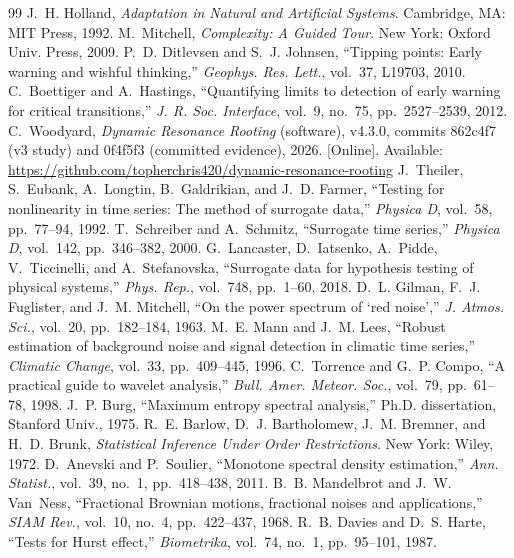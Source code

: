 \documentclass[10pt,twocolumn,letterpaper]{article}
\theoremstyle{definition}
\theoremstyle{remark}
\begin{document}
\footnotesize
\begin{thebibliography}{99}\setlength{\itemsep}{-0.8pt}\setlength{\parsep}{0pt}
 J.~H. Holland, \emph{Adaptation in Natural and Artificial Systems}. Cambridge, MA: MIT Press, 1992.
 M.~Mitchell, \emph{Complexity: A Guided Tour}. New York: Oxford Univ. Press, 2009.
 P.~D. Ditlevsen and S.~J. Johnsen, ``Tipping points: Early warning and wishful thinking,'' \emph{Geophys. Res. Lett.}, vol.~37, L19703, 2010.
 C.~Boettiger and A.~Hastings, ``Quantifying limits to detection of early warning for critical transitions,'' \emph{J. R. Soc. Interface}, vol.~9, no.~75, pp.~2527--2539, 2012.
 C.~Woodyard, \emph{Dynamic Resonance Rooting} (software), v4.3.0, commits 862c4f7 (v3 study) and 0f4f5f3 (committed evidence), 2026. [Online]. Available: \url{https://github.com/topherchris420/dynamic-resonance-rooting}
 J.~Theiler, S.~Eubank, A.~Longtin, B.~Galdrikian, and J.~D. Farmer, ``Testing for nonlinearity in time series: The method of surrogate data,'' \emph{Physica D}, vol.~58, pp.~77--94, 1992.
 T.~Schreiber and A.~Schmitz, ``Surrogate time series,'' \emph{Physica D}, vol.~142, pp.~346--382, 2000.
 G.~Lancaster, D.~Iatsenko, A.~Pidde, V.~Ticcinelli, and A.~Stefanovska, ``Surrogate data for hypothesis testing of physical systems,'' \emph{Phys. Rep.}, vol.~748, pp.~1--60, 2018.
 D.~L. Gilman, F.~J. Fuglister, and J.~M. Mitchell, ``On the power spectrum of `red noise','' \emph{J. Atmos. Sci.}, vol.~20, pp.~182--184, 1963.
 M.~E. Mann and J.~M. Lees, ``Robust estimation of background noise and signal detection in climatic time series,'' \emph{Climatic Change}, vol.~33, pp.~409--445, 1996.
 C.~Torrence and G.~P. Compo, ``A practical guide to wavelet analysis,'' \emph{Bull. Amer. Meteor. Soc.}, vol.~79, pp.~61--78, 1998.
 J.~P. Burg, ``Maximum entropy spectral analysis,'' Ph.D. dissertation, Stanford Univ., 1975.
 R.~E. Barlow, D.~J. Bartholomew, J.~M. Bremner, and H.~D. Brunk, \emph{Statistical Inference Under Order Restrictions}. New York: Wiley, 1972.
 D.~Anevski and P.~Soulier, ``Monotone spectral density estimation,'' \emph{Ann. Statist.}, vol.~39, no.~1, pp.~418--438, 2011.
 B.~B. Mandelbrot and J.~W. Van~Ness, ``Fractional Brownian motions, fractional noises and applications,'' \emph{SIAM Rev.}, vol.~10, no.~4, pp.~422--437, 1968.
 R.~B. Davies and D.~S. Harte, ``Tests for Hurst effect,'' \emph{Biometrika}, vol.~74, no.~1, pp.~95--101, 1987.

\end{thebibliography}
\end{document}
